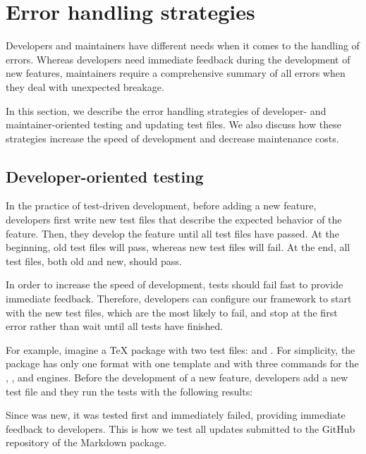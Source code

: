 \documentclass[final]{ltugboat}
\begin{document}
\section{Error handling strategies}
\label{sec:error-handling-strategies}

Developers and maintainers have different needs when it comes to the handling of errors. Whereas developers need immediate feedback during the development of new features, maintainers require a comprehensive summary of all errors when they deal with unexpected breakage.

In this section, we describe the error handling strategies of developer- and maintainer-oriented testing and updating test files. We also discuss how these strategies increase the speed of development and decrease maintenance costs.

\subsection{Developer-oriented testing}

In the practice of test-driven development, before adding a new feature, developers first write new test files that describe the expected behavior of the feature. Then, they develop the feature until all test files have passed. At the beginning, old test files will pass, whereas new test files will fail. At the end, all test files, both old and new, should pass.

In order to increase the speed of development, tests should fail fast to provide immediate feedback. Therefore, developers can configure our framework to start with the new test files, which are the most likely to fail, and stop at the first error rather than wait until all tests have finished.

For example, imagine a \TeX{} package with two test files:  and . For simplicity, the package has only one format with one template and with three commands for the , , and  engines. Before the development of a new feature, developers add a new test file  and they run the tests with the following results:

\medskip
\noindent
\begingroup
\centering

\par
\endgroup

\medskip
\noindent
Since  was new, it was tested first and immediately failed, providing immediate feedback to developers. This is how we test all updates submitted to the GitHub repository of the Markdown package.
\end{document}
